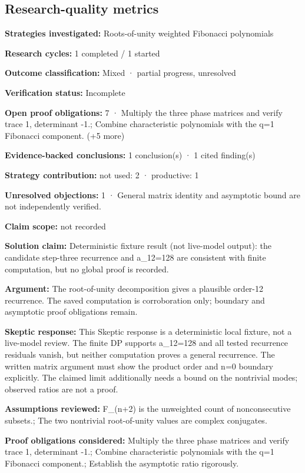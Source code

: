 \documentclass[11pt]{article}
\begin{document}
\subsection{Research-quality metrics}
\textbf{Strategies investigated:} Roots-of-unity weighted Fibonacci polynomials\par
\textbf{Research cycles:} 1 completed / 1 started\par
\textbf{Outcome classification:} Mixed · partial progress, unresolved\par
\textbf{Verification status:} Incomplete\par
\textbf{Open proof obligations:} 7 · Multiply the three phase matrices and verify trace 1, determinant -1.; Combine characteristic polynomials with the q=1 Fibonacci component. (+5 more)\par
\textbf{Evidence-backed conclusions:} 1 conclusion(s) · 1 cited finding(s)\par
\textbf{Strategy contribution:} not used: 2 · productive: 1\par
\textbf{Unresolved objections:} 1 · General matrix identity and asymptotic bound are not independently verified.\par
\textbf{Claim scope:} not recorded\par
\textbf{Solution claim:} Deterministic fixture result (not live-model output): the candidate step-three recurrence and a\_12=128 are consistent with finite computation, but no global proof is recorded.\par
\textbf{Argument:} The root-of-unity decomposition gives a plausible order-12 recurrence. The saved computation is corroboration only; boundary and asymptotic proof obligations remain.\par
\textbf{Skeptic response:} This Skeptic response is a deterministic local fixture, not a live-model review. The finite DP supports a\_12=128 and all tested recurrence residuals vanish, but neither computation proves a general recurrence. The written matrix argument must show the product order and n=0 boundary explicitly. The claimed limit additionally needs a bound on the nontrivial modes; observed ratios are not a proof.\par
\textbf{Assumptions reviewed:} F\_(n+2) is the unweighted count of nonconsecutive subsets.; The two nontrivial root-of-unity values are complex conjugates.\par
\textbf{Proof obligations considered:} Multiply the three phase matrices and verify trace 1, determinant -1.; Combine characteristic polynomials with the q=1 Fibonacci component.; Establish the asymptotic ratio rigorously.\par
\end{document}
